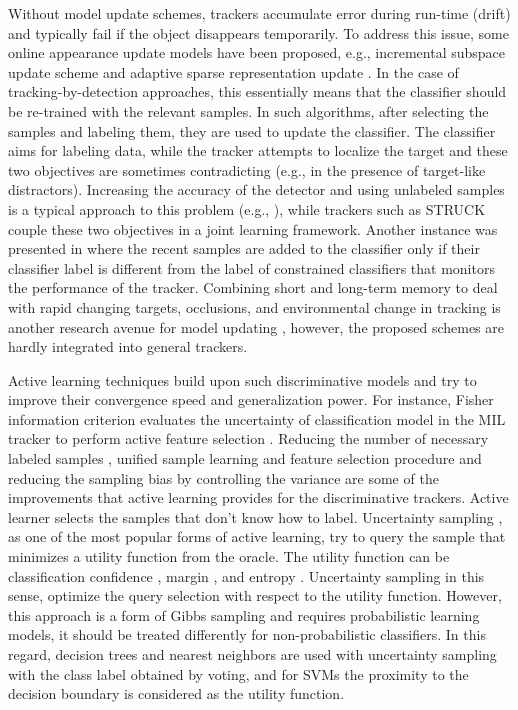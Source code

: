 \documentclass[conference,twoside]{IEEEtran}
\begin{document}
Without model update schemes, trackers accumulate error during run-time (drift) and typically fail if the object disappears temporarily. To address this issue, some online appearance update models have been proposed, e.g., incremental subspace update scheme and adaptive sparse representation update \cite{bao2012real}. In the case of tracking-by-detection approaches, this essentially means that the classifier should be re-trained with the relevant samples. In such algorithms, after selecting the samples and labeling them, they are used to update the classifier. The classifier aims for labeling data, while the tracker attempts to localize the target and these two objectives are sometimes contradicting (e.g., in the presence of target-like distractors). Increasing the accuracy of the detector and using unlabeled samples is a typical approach to this problem (e.g., \cite{grabner2008semi,babenko2009visual}), while trackers such as STRUCK \cite{hare2011struck} couple these two objectives in a joint learning framework. Another instance was presented in \cite{kalal2012tracking} where the recent samples are added to the classifier only if their classifier label is different from the label of constrained classifiers that monitors the performance of the tracker. Combining short and long-term memory to deal with rapid changing targets, occlusions, and environmental change in tracking is another research avenue for model updating \cite{hong2015multi}, however, the proposed schemes are hardly integrated into general trackers.

Active learning techniques build upon such discriminative models and try to improve their convergence speed and generalization power. For instance, Fisher information criterion evaluates the uncertainty of classification model in the MIL tracker \cite{babenko2009visual} to perform active feature selection \cite{zhang2013robust}. Reducing the number of necessary labeled samples \cite{lampert2009active}, unified sample learning and feature selection procedure \cite{li2015active} and reducing the sampling bias by controlling the variance \cite{beygelzimer2009importance} are some of the improvements that active learning provides for the discriminative trackers. Active learner selects the samples that don't know how to label. Uncertainty sampling \cite{lewis1994sequential}, as one of the most popular forms of active learning, try to query the sample that minimizes a utility function from the oracle. The utility function can be classification confidence \cite{lewis1994heterogeneous}, margin \cite{scheffer2001active}, and entropy \cite{settles2008analysis}. Uncertainty sampling in this sense, optimize the query selection with respect to the utility function. However, this approach is a form of Gibbs sampling and requires probabilistic learning models, it should be treated differently for non-probabilistic classifiers. In this regard, decision trees \cite{lewis1994heterogeneous} and nearest neighbors \cite{lindenbaum2004selective} are used with uncertainty sampling with the class label obtained by voting, and for SVMs \cite{tong2002support} the proximity to the decision boundary is considered as the utility function. 
\end{document}
